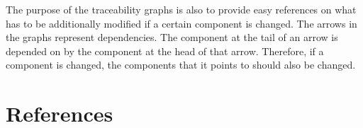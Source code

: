 \documentclass[12pt]{article}
\begin{document}
The purpose of the traceability graphs is also to provide easy references on
what has to be additionally modified if a certain component is changed.  The
arrows in the graphs represent dependencies. The component at the tail of an
arrow is depended on by the component at the head of that arrow. Therefore, if a
component is changed, the components that it points to should also be
changed. 


\newpage

\section{References}







\newpage

\newpage
\end{document}
